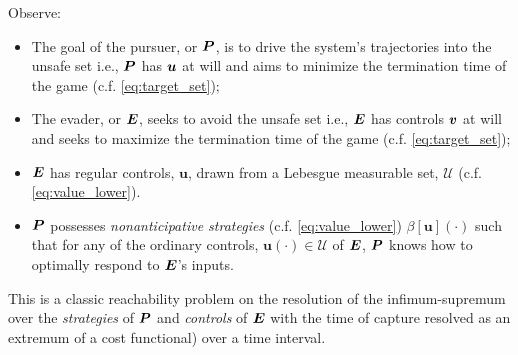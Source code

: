 Observe:
%
\begin{itemize}
	\item The goal of the pursuer, or $\bm{P}$, is to drive the system's trajectories into the unsafe set i.e., $\bm{P}$ has $\bm{u}$ at will and aims to minimize the termination time of the game  (c.f. \eqref{eq:target_set});
	\item The evader, or $\bm{E}$, seeks to avoid the unsafe  set i.e., $\bm{E}$ has controls $\bm{v}$ at will and seeks to maximize the termination time of the game (c.f.  \eqref{eq:target_set});
	\item $\bm{E}$ has regular controls, $\bm{u}$, drawn from a Lebesgue measurable set, $\mathcal{U}$ (c.f. \eqref{eq:value_lower}).
	\item $\bm{P}$ possesses \textit{nonanticipative strategies} (c.f. \eqref{eq:value_lower}) \ie  $\beta[\bm{u}](\cdot)$ such that for any of the ordinary controls, $\bm{u}(\cdot) \in \mathcal{U}$ of $\bm{E}$, $\bm{P}$ knows how to optimally respond to $\bm{E}$'s inputs.
\end{itemize}
%
This is a classic reachability problem on the resolution of the infimum-supremum over the \textit{strategies} of $\bm{P}$ and \textit{controls} of $\bm{E}$ with the time of capture resolved as an extremum of a cost functional) over a time interval.%
%
%

